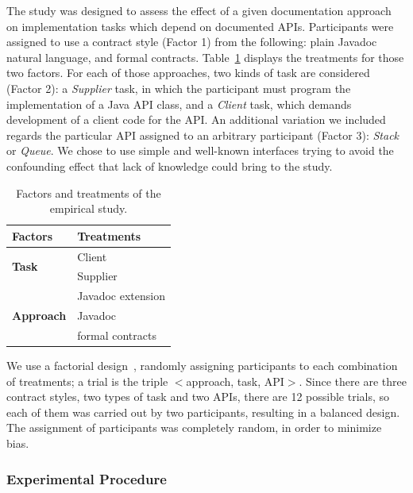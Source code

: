 The study was designed to assess the effect of a given documentation approach on implementation tasks which depend on documented APIs. 
Participants were assigned to use a contract style (Factor 1) from the following: plain Javadoc natural language, \contractjdoc{} and formal contracts. Table~\ref{tab:factorsEmpStudy} displays the treatments for those two factors.
For each of those approaches, two kinds of task are considered (Factor 2): a \textit{Supplier} task, in which the participant must program the implementation of a Java API class, and a \textit{Client} task, which demands development of a client code for the API.
An additional variation we included regards the particular API assigned to an arbitrary participant (Factor 3): \textit{Stack} or \textit{Queue}. We chose to use simple and well-known interfaces trying to avoid the confounding effect that lack of knowledge could bring to the study.


\begin{table}[ht]
\caption{Factors and treatments of the empirical study.}
\label{tab:factorsEmpStudy}
\centering
\begin{tabular}{ll} \toprule
\bfseries Factors & \bfseries Treatments \\
\hline

\multirow{2}{*}{\textbf{Task}} & Client \\
& Supplier \\ \hline 

\multirow{3}{*}{\textbf{Approach}} & Javadoc extension \\
 & Javadoc \\
& formal contracts \\ \bottomrule
\end{tabular}
\end{table}

We use a factorial design~\cite{wohlin}, randomly assigning participants to each combination of treatments; a trial is the triple $<$approach, task, API$>$.
Since there are three contract styles, two types of task and two APIs, there are 12 possible trials, so each of them was carried out by two participants, resulting in a balanced design. 
The assignment of participants was completely random, in order to minimize bias.

\subsubsection{Experimental Procedure}
\label{sec:expProcedure}

